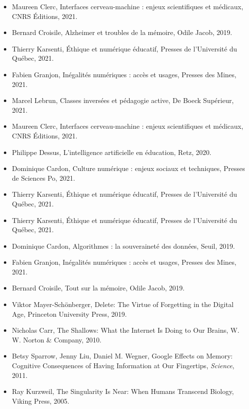 \documentclass[12pt,a4paper]{report}
\begin{document}
\begin{itemize}
    \item Maureen Clerc, Interfaces cerveau-machine : enjeux scientifiques et médicaux, CNRS Éditions, 2021.
    \item Bernard Croisile, Alzheimer et troubles de la mémoire, Odile Jacob, 2019.
    \item Thierry Karsenti, Éthique et numérique éducatif, Presses de l’Université du Québec, 2021.
    \item Fabien Granjon, Inégalités numériques : accès et usages, Presses des Mines, 2021.
    
    \item Marcel Lebrun, Classes inversées et pédagogie active, De Boeck Supérieur, 2021.
    \item Maureen Clerc, Interfaces cerveau-machine : enjeux scientifiques et médicaux, CNRS Éditions, 2021.
    \item Philippe Dessus, L’intelligence artificielle en éducation, Retz, 2020.
    \item Dominique Cardon, Culture numérique : enjeux sociaux et techniques, Presses de Sciences Po, 2021.
    \item Thierry Karsenti, Éthique et numérique éducatif, Presses de l’Université du Québec, 2021.
    
    \item Thierry Karsenti, Éthique et numérique éducatif, Presses de l’Université du Québec, 2021.
    \item Dominique Cardon, Algorithmes : la souveraineté des données, Seuil, 2019.
    \item Fabien Granjon, Inégalités numériques : accès et usages, Presses des Mines, 2021.
    \item Bernard Croisile, Tout sur la mémoire, Odile Jacob, 2019.
    
    \item Viktor Mayer-Schönberger, Delete: The Virtue of Forgetting in the Digital Age, Princeton University Press, 2019.
    \item Nicholas Carr, The Shallows: What the Internet Is Doing to Our Brains, W. W. Norton \& Company, 2010.
    \item Betsy Sparrow, Jenny Liu, Daniel M. Wegner, Google Effects on Memory: Cognitive Consequences of Having Information at Our Fingertips, \textit{Science}, 2011.
    \item Ray Kurzweil, The Singularity Is Near: When Humans Transcend Biology, Viking Press, 2005.

\end{itemize}
\end{document}
